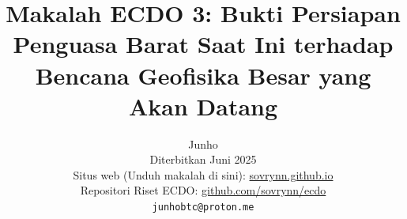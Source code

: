 \documentclass[10pt,twocolumn,letterpaper]{article}
\begin{document}
\title{Makalah ECDO 3: Bukti Persiapan Penguasa Barat Saat Ini terhadap Bencana Geofisika Besar yang Akan Datang}

\author{Junho\\
Diterbitkan Juni 2025\\
Situs web (Unduh makalah di sini): \href{https://sovrynn.github.io}{sovrynn.github.io}\\
Repositori Riset ECDO: \href{https://github.com/sovrynn/ecdo}{github.com/sovrynn/ecdo}\\
{\tt\small junhobtc@proton.me}
}

\maketitle
\end{document}
